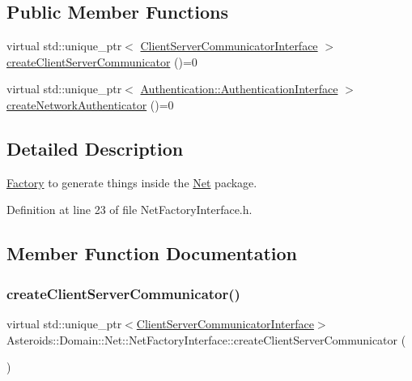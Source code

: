 \subsection*{Public Member Functions}
\begin{DoxyCompactItemize}
\item 
virtual std\+::unique\+\_\+ptr$<$ \hyperlink{classAsteroids_1_1Domain_1_1Net_1_1ClientServerCommunicatorInterface}{Client\+Server\+Communicator\+Interface} $>$ \hyperlink{classAsteroids_1_1Domain_1_1Net_1_1NetFactoryInterface_a821b85ef5a86418acc27bdf337c32b99}{create\+Client\+Server\+Communicator} ()=0
\item 
virtual std\+::unique\+\_\+ptr$<$ \hyperlink{classAsteroids_1_1Domain_1_1Net_1_1Authentication_1_1AuthenticationInterface}{Authentication\+::\+Authentication\+Interface} $>$ \hyperlink{classAsteroids_1_1Domain_1_1Net_1_1NetFactoryInterface_a933b03a4fcb601e4478409fdf5794168}{create\+Network\+Authenticator} ()=0
\end{DoxyCompactItemize}


\subsection{Detailed Description}
\hyperlink{namespaceAsteroids_1_1Domain_1_1Factory}{Factory} to generate things inside the \hyperlink{namespaceAsteroids_1_1Domain_1_1Net}{Net} package. 

Definition at line 23 of file Net\+Factory\+Interface.\+h.



\subsection{Member Function Documentation}
\mbox{\label{classAsteroids_1_1Domain_1_1Net_1_1NetFactoryInterface_a821b85ef5a86418acc27bdf337c32b99}} 
\subsubsection{\texorpdfstring{create\+Client\+Server\+Communicator()}{createClientServerCommunicator()}}
{\footnotesize\ttfamily virtual std\+::unique\+\_\+ptr$<$\hyperlink{classAsteroids_1_1Domain_1_1Net_1_1ClientServerCommunicatorInterface}{Client\+Server\+Communicator\+Interface}$>$ Asteroids\+::\+Domain\+::\+Net\+::\+Net\+Factory\+Interface\+::create\+Client\+Server\+Communicator (\begin{DoxyParamCaption}{ }\end{DoxyParamCaption})\hspace{0.3cm}{\ttfamily [pure virtual]}}




